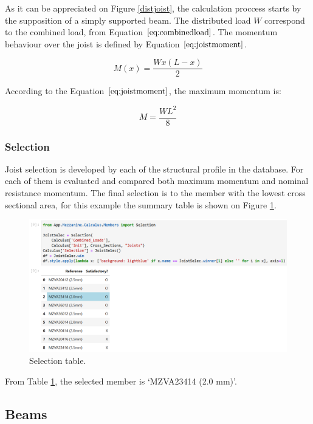As it can be appreciated on Figure \ref{distjoist}, the calculation proccess starts by the supposition of a simply supported beam. The distributed load $W$ correspond to the combined load, from Equation $\eqref{eq:combinedload}$. The momentum behaviour over the joist is defined by Equation $\eqref{eq:joistmoment}$.

\begin{equation}
M(x) = \frac{W x (L-x)}{2}
\label{eq:joistmoment}
\end{equation}

According to the Equation $\eqref{eq:joistmoment}$, the maximum momentum is:

\begin{equation}
M = \frac{W L^2}{8}
\end{equation}

\subsubsection{Selection}

Joist selection is developed by each of the structural profile in the database. For each of them is evaluated and compared both maximum momentum and nominal resistance momentum. The final selection is to the member with the lowest cross sectional area, for this example the summary table is shown on Figure \ref{joistselec}.

\begin{figure}[h!]
\centering
\includegraphics[width=\textwidth]{Images/Calculus/viguetaselec.PNG}
\caption{Selection table.}
\label{joistselec}
\end{figure} 

From Table \ref{joistselec}, the selected member is `MZVA23414 (2.0 mm)'.

\subsection{Beams}

